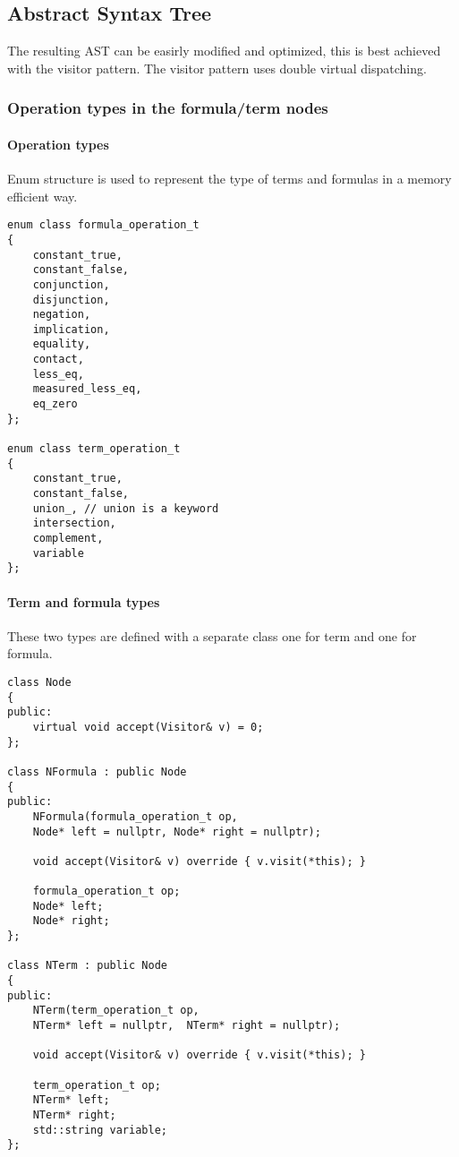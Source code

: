 \documentclass{article}
\begin{document}
		\subsection{Abstract Syntax Tree}
			The resulting AST can be easirly modified and optimized, this is best achieved with the visitor pattern.
			The visitor pattern uses double virtual dispatching.

			\subsubsection{Operation types in the formula/term nodes}
				\paragraph{Operation types}  Enum structure is used to represent the type of terms and formulas in a memory efficient way.
				\begin{lstlisting}
enum class formula_operation_t
{
    constant_true,
    constant_false,
    conjunction,
    disjunction,
    negation,
    implication,
    equality,
    contact,
    less_eq,
    measured_less_eq,
    eq_zero
};

enum class term_operation_t
{
    constant_true,
    constant_false,
    union_, // union is a keyword
    intersection,
    complement,
    variable
};
				\end{lstlisting}

				\paragraph{Term and formula types} These two types are defined with a separate class one for term and one for formula.
				\begin{lstlisting}
class Node
{
public:
    virtual void accept(Visitor& v) = 0;
};

class NFormula : public Node
{
public:
    NFormula(formula_operation_t op, 
	Node* left = nullptr, Node* right = nullptr);

    void accept(Visitor& v) override { v.visit(*this); }

    formula_operation_t op;
    Node* left;
    Node* right;
};

class NTerm : public Node
{
public:
    NTerm(term_operation_t op, 
	NTerm* left = nullptr,  NTerm* right = nullptr);

    void accept(Visitor& v) override { v.visit(*this); }

    term_operation_t op;
    NTerm* left;
    NTerm* right;
    std::string variable;
};
				\end{lstlisting}
\end{document}
